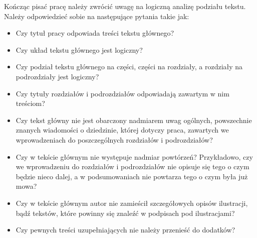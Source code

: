Kończąc pisać pracę należy zwrócić uwagę na logiczną analizę podziału tekstu. Należy odpowiedzieć sobie na następujące pytania takie jak:
\begin{itemize}
	\item Czy tytuł pracy odpowiada treści tekstu głównego? 
	\item Czy układ tekstu głównego jest logiczny?
	\item Czy podział tekstu głównego na części, części na rozdziały, a rozdziały na podrozdziały jest logiczny?
	\item Czy tytuły rozdziałów i podrozdziałów odpowiadają zawartym w nim treściom?
	\item Czy tekst główny nie jest obarczony nadmiarem uwag ogólnych, powszechnie znanych wiadomości o dziedzinie, której dotyczy praca, zawartych we wprowadzeniach do poszczególnych rozdziałów i podrozdziałów?
	\item Czy w tekście głównym nie występuje nadmiar powtórzeń? Przykładowo, czy we wprowadzeniu do rozdziałów i podrozdziałów nie opisuje się tego o czym będzie nieco dalej, a w podsumowaniach nie powtarza tego o czym była już mowa?
	\item Czy w tekście głównym autor nie zamieścił szczegółowych opisów ilustracji, bądź tekstów, które powinny się znaleźć w podpisach pod ilustracjami?
	\item Czy pewnych treści uzupełniających nie należy przenieść do dodatków?
\end{itemize} 